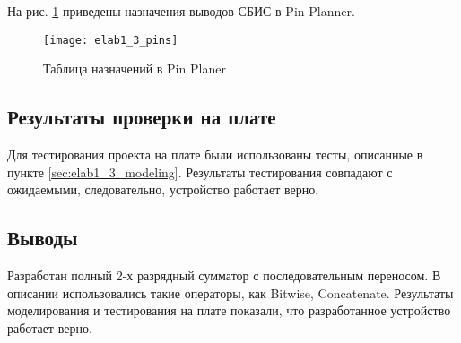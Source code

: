 На рис. \ref{fig:elab1_3_pins} приведены назначения выводов СБИС в Pin Planner.

\begin{figure}[H]
\begin{center}
	\texttt{[image: elab1\_3\_pins]}
	\caption{Таблица назначений в Pin Planer}
	\label{fig:elab1_3_pins}
\end{center}
\end{figure}

\subsection{Результаты проверки на плате}

Для тестирования проекта на плате были использованы тесты, описанные в пункте \ref{sec:elab1_3_modeling}. Результаты тестирования совпадают с ожидаемыми, следовательно, устройство работает верно.

\subsection{Выводы}

Разработан полный 2-х разрядный сумматор с последовательным переносом. В описании использовались такие операторы, как Bitwise, Concatenate. Результаты моделирования и тестирования на плате показали, что разработанное устройство работает верно.

